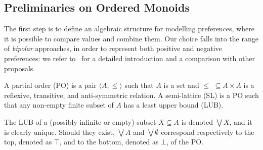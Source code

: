 \documentclass{llncs}
\newcommand{\comment}[1]{}
\def\monid{{\mathbf 0}}
\def\monid{\mathbf{1}}
\begin{document}
\subsection{Preliminaries on Ordered Monoids}\label{sec:lem}

The first step is to define an algebraic structure for modelling preferences,
where it is possible to compare values and combine them.
Our choice falls into the range of \emph{bipolar} approaches, in order 
to represent both positive and negative preferences: 
we refer to~\cite{ipl17} for a detailed introduction and 
a comparison with other proposals.

\begin{definition}[Orders]
	A partial order (PO) is a pair $\langle A, \leq \rangle$ such that
	$A$ is a set %
	and $\leq \,\,\subseteq A \times A$ is a reflexive, transitive, and
	anti-symmetric  relation.
	A semi-lattice (SL) is a PO
	such that any non-empty finite subset of $A$ has a least upper bound (LUB).
\end{definition}

The LUB of a (possibly infinite or empty) subset $X \subseteq A$ is denoted $\bigvee X$, and it is clearly unique.
Should  they exist, $\bigvee A$ and $\bigvee \emptyset$ correspond respectively to the top, denoted as 
$\top$, and to the bottom, denoted as $\bot$, of the PO.

\comment{\begin{definition}[Compact elements]
An element $a \in A$ is compact 
if whenever $a \leq \bigvee Y$ for some $Y \subseteq A$
there exists a finite subset
$X \subseteq Y$ such that $a \leq \bigvee X$.
%
\end{definition}

We let $A^C \subseteq A$ denote the set of compact elements of ${\mathbb C}$. }

%
\end{document}
